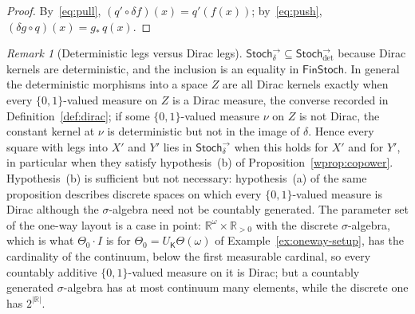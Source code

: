 \documentclass[11pt,a4paper]{article}
\theoremstyle{plain}
\theoremstyle{definition}
\theoremstyle{remark}
\newtheorem{remark}[theorem]{Remark}
\newcommand{\cat}[1]{\mathsf{#1}}
\newcommand{\catK}{\cat{K}}
\newcommand{\Stoch}{\cat{Stoch}}
\newcommand{\FinStoch}{\cat{FinStoch}}
\newcommand{\del}{\delta}
\newcommand{\R}{\mathbb{R}}
\newcommand{\Arrdet}[1]{#1^{\rightarrow}_{\det}}
\newcommand{\Arrim}[1]{#1^{\rightarrow}_{\del}}
\begin{document}
\begin{proof}
By~\eqref{eq:pull}, $(q' \circ \del f)(x) = q'(f(x))$; by~\eqref{eq:push},
$(\del g \circ q)(x) = g_{*}\, q(x)$.
\end{proof}

\begin{remark}[Deterministic legs versus Dirac legs]\label{rem:arrim}
$\Arrim{\Stoch} \subseteq \Arrdet{\Stoch}$ because Dirac kernels are
deterministic, and the inclusion is an equality in $\FinStoch$. In general the
deterministic morphisms into a space $Z$ are all Dirac kernels exactly when
every $\{0,1\}$-valued measure on $Z$ is a Dirac measure, the converse
recorded in Definition~\ref{def:dirac}; if some $\{0,1\}$-valued measure
$\nu$ on $Z$ is not Dirac, the constant kernel at $\nu$ is deterministic but
not in the image of $\del$. Hence every square with legs into $X'$ and $Y'$
lies in $\Arrim{\Stoch}$ when this holds for $X'$ and for $Y'$, in particular
when they satisfy hypothesis~(b) of Proposition~\ref{wprop:copower}.
Hypothesis~(b) is sufficient but not necessary: hypothesis~(a) of the same
proposition describes discrete spaces on which every $\{0,1\}$-valued measure
is Dirac although the $\sigma$-algebra need not be countably generated. The
parameter set of the one-way layout is a case in point: $\R^{\omega} \times
\R_{>0}$ with the discrete $\sigma$-algebra, which is what $\Theta_0 \cdot I$
is for $\Theta_0 = U_\catK\Theta(\omega)$ of Example~\ref{ex:oneway-setup},
has the cardinality of the continuum, below the first measurable cardinal, so
every countably additive $\{0,1\}$-valued measure on it is Dirac; but a
countably generated $\sigma$-algebra has at most continuum many elements,
while the discrete one has $2^{|\R|}$.
\end{remark}
\end{document}

